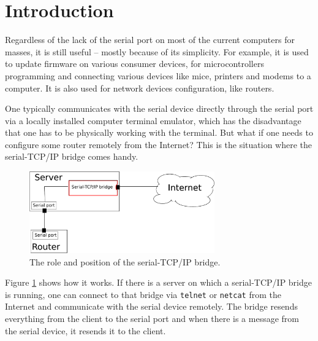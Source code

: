 
\section{Introduction}

Regardless of the lack of the serial port \cite{WikiSerialPort} on most of the
current computers for masses, it is still useful -- mostly because of its
simplicity. For example, it is used to update firmware on various consumer devices,
for microcontrollers programming and connecting various devices like mice, printers and modems
to a computer. It is also used for network devices configuration, like routers.

One typically communicates with the serial device directly through the serial port
via a locally installed computer terminal emulator, which has the disadvantage
that one has to be physically working with the terminal. But what if one needs
to configure some router remotely from the Internet? This is the situation
where the serial-TCP/IP bridge comes handy.

\begin{figure}[ht!]
	\begin{center}
		\includegraphics[width=8cm,keepaspectratio]{introduction}
		\caption{The role and position of the serial-TCP/IP bridge.}
		\label{serial-tcpip-bridge-role}
	\end{center}
\end{figure}

Figure \ref{serial-tcpip-bridge-role} shows how it works. If there
is a server on which a serial-TCP/IP bridge is running, one can connect
to that bridge via \texttt{telnet} or \texttt{netcat} from the Internet and
communicate with the serial device remotely. The bridge resends everything
from the client to the serial port and when there is a message from the serial
device, it resends it to the client.


